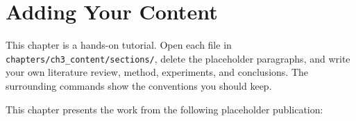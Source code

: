 \chapter{Adding Your Content}
\glsresetall %

\begin{cabstract}
This chapter is a hands-on tutorial. Open each file in \texttt{chapters/ch3\_content/sections/}, delete the placeholder paragraphs, and write your own literature review, method, experiments, and conclusions. The surrounding commands show the conventions you should keep.
\end{cabstract}

This chapter presents the work from the following placeholder publication:








